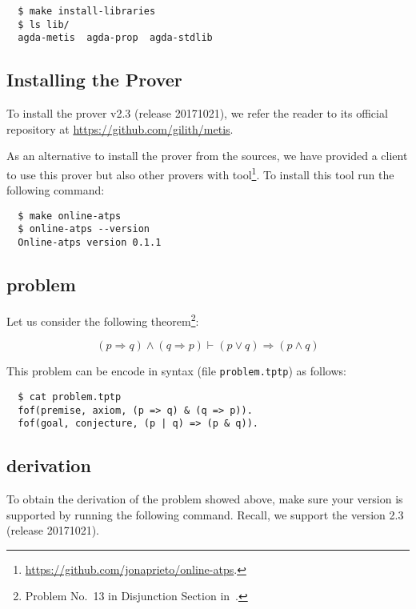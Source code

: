 \documentclass[../main.tex]{subfiles}
\begin{document}
\begin{subappendices}
\begin{verbatim}
  $ make install-libraries
  $ ls lib/
  agda-metis  agda-prop  agda-stdlib
\end{verbatim}

\subsection{Installing the \Metis Prover}

To install the \Metis prover v2.3 (release 20171021),
we refer the reader to its official
repository at \url{https://github.com/gilith/metis}.

As an alternative to install the prover from the \Metis sources,
we have provided a \Haskell client
to use this prover but also other provers with 
tool\footnote{\url{https://github.com/jonaprieto/online-atps}.}.
To install this tool run the following command:

\begin{verbatim}
  $ make online-atps
  $ online-atps --version
  Online-atps version 0.1.1
\end{verbatim}

\subsection{\TPTP problem}

Let us consider the following
theorem\footnote{Problem No.~13 in Disjunction Section in~\cite{Prieto-Cubides2017}.}:

\begin{equation}
\label{eq:complete-example-problem}
(p \Rightarrow q) \wedge (q \Rightarrow p) ⊢ (p \vee q) \Rightarrow (p \wedge q)
\end{equation}

This problem can be encode in \TPTP syntax (file \verb!problem.tptp!) as follows:

\begin{verbatim}
  $ cat problem.tptp
  fof(premise, axiom, (p => q) & (q => p)).
  fof(goal, conjecture, (p | q) => (p & q)).
\end{verbatim}

\subsection{\Metis derivation}

To obtain the \Metis derivation of the \TPTP problem showed above,
make sure your \Metis version is supported by running the following command.
Recall, we support the version 2.3 (release 20171021).


\end{subappendices}
\end{document}
